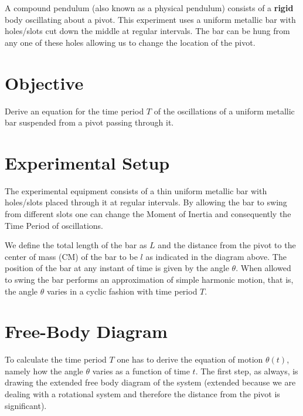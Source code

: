 
A compound pendulum (also known as a physical pendulum) consists of a \textbf{rigid} body oscillating about a pivot. This experiment uses a uniform metallic bar with holes/slots cut down the middle at regular intervals. The bar can be hung from any one of these holes allowing us to change the location of the pivot.

\section{Objective}

Derive an equation for the time period $T$ of the oscillations of a uniform metallic bar suspended from a pivot passing through it.

\section{Experimental Setup}

   The experimental equipment consists of a thin uniform metallic bar with holes/slots placed through it at regular intervals. By allowing the bar to swing from different slots one can change the Moment of Inertia and consequently the Time Period of oscillations.

   \begin{center}
   \end{center}

   We define the total length of the bar as $L$ and the distance from the pivot to the center of mass (CM) of the bar to be $l$ as indicated in the diagram above. The position of the bar at any instant of time is given by the angle $\theta$. When allowed to swing the bar performs an approximation of simple harmonic motion, that is, the angle $\theta$ varies in a cyclic fashion with time period $T$.

\section{Free-Body Diagram}

   To calculate the time period $T$ one has to derive the equation of motion $\theta(t)$, namely how the angle $\theta$ varies as a function of time $t$. The first step, as always, is drawing the extended free body diagram of the system (extended because we are dealing with a rotational system and therefore the distance from the pivot is significant).

